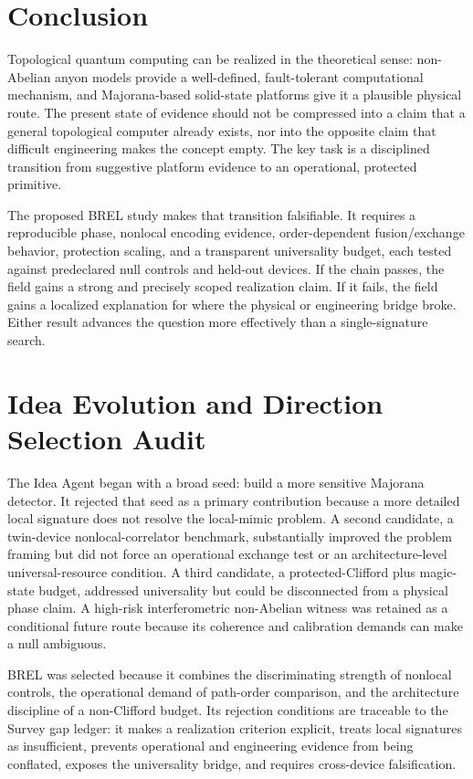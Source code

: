 \documentclass[conference]{IEEEtran}
\begin{document}
\section{Conclusion}

Topological quantum computing can be realized in the theoretical sense: non-Abelian anyon models provide a well-defined, fault-tolerant computational mechanism, and Majorana-based solid-state platforms give it a plausible physical route. The present state of evidence should not be compressed into a claim that a general topological computer already exists, nor into the opposite claim that difficult engineering makes the concept empty. The key task is a disciplined transition from suggestive platform evidence to an operational, protected primitive.

The proposed BREL study makes that transition falsifiable. It requires a reproducible phase, nonlocal encoding evidence, order-dependent fusion/exchange behavior, protection scaling, and a transparent universality budget, each tested against predeclared null controls and held-out devices. If the chain passes, the field gains a strong and precisely scoped realization claim. If it fails, the field gains a localized explanation for where the physical or engineering bridge broke. Either result advances the question more effectively than a single-signature search.

\appendices
\section{Idea Evolution and Direction Selection Audit}

The Idea Agent began with a broad seed: build a more sensitive Majorana detector. It rejected that seed as a primary contribution because a more detailed local signature does not resolve the local-mimic problem. A second candidate, a twin-device nonlocal-correlator benchmark, substantially improved the problem framing but did not force an operational exchange test or an architecture-level universal-resource condition. A third candidate, a protected-Clifford plus magic-state budget, addressed universality but could be disconnected from a physical phase claim. A high-risk interferometric non-Abelian witness was retained as a conditional future route because its coherence and calibration demands can make a null ambiguous.

BREL was selected because it combines the discriminating strength of nonlocal controls, the operational demand of path-order comparison, and the architecture discipline of a non-Clifford budget. Its rejection conditions are traceable to the Survey gap ledger: it makes a realization criterion explicit, treats local signatures as insufficient, prevents operational and engineering evidence from being conflated, exposes the universality bridge, and requires cross-device falsification.
\end{document}
